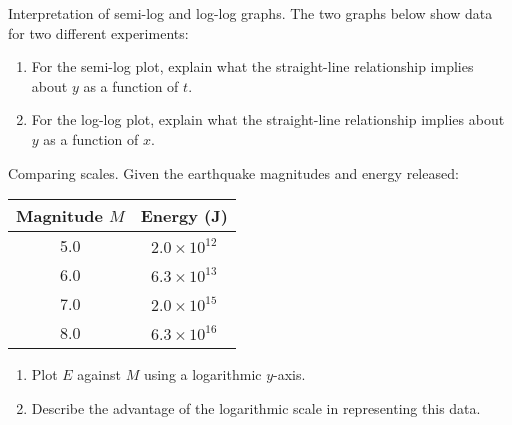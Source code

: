 \documentclass[11pt]{article}
\def\textbf#1{#1}%
\newcounter{question}
\begin{document}
\begin{question}
\textbf{Interpretation of semi-log and log-log graphs.}
The two graphs below show data for two different experiments:

\begin{center}
\end{center}

\begin{enumerate}
    \item For the semi-log plot, explain what the straight-line relationship implies about $y$ as a function of $t$.
    \item For the log-log plot, explain what the straight-line relationship implies about $y$ as a function of $x$.
\end{enumerate}
\end{question}

\begin{question}
\textbf{Comparing scales.}
Given the earthquake magnitudes and energy released:

\begin{center}
\begin{tabular}{c|c}
Magnitude $M$ & Energy (J) \\
\hline
5.0 & $2.0\times 10^{12}$ \\
6.0 & $6.3\times 10^{13}$ \\
7.0 & $2.0\times 10^{15}$ \\
8.0 & $6.3\times 10^{16}$
\end{tabular}
\end{center}

\begin{enumerate}
    \item Plot $E$ against $M$ using a logarithmic $y$-axis.
    \item Describe the advantage of the logarithmic scale in representing this data.
\end{enumerate}
\end{question}
\end{document}
